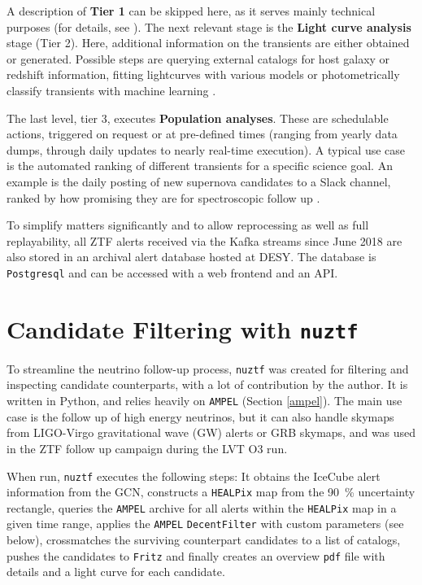 \documentclass[
    a4paper, %
    fontsize=10pt, %
    twoside=true, %
    numbers=noenddot, %
    fontmethod=tex,
]{kaobook}
\begin{document}
A description of \textbf{Tier 1} can be skipped here, as it serves mainly technical purposes (for details, see \cite{Nordin2019}). The next relevant stage is the \textbf{Light curve analysis} stage (Tier 2). Here, additional information on the transients are either obtained or generated. Possible steps are querying external catalogs for host galaxy or redshift information, fitting lightcurves with various models or photometrically classify transients with machine learning \cite{Nordin2019}.

The last level, tier 3, executes \textbf{Population analyses}. These are schedulable actions, triggered on request or at pre-defined times (ranging from yearly data dumps, through daily updates to nearly real-time execution). A typical use case is the automated ranking of different transients for a specific science goal. An example is the daily posting of new supernova candidates to a Slack channel, ranked by how promising they are for spectroscopic follow up \cite{Nordin2019}.

To simplify matters significantly and to allow reprocessing as well as full replayability, all ZTF alerts received via the Kafka streams since June 2018 are also stored in an archival alert database hosted at DESY. The database is \texttt{Postgresql} and can be accessed with a web frontend and an API.

\section{Candidate Filtering with \texttt{nuztf}}
To streamline the neutrino follow-up process, \texttt{nuztf}  was created for filtering and inspecting candidate counterparts, with a lot of contribution by the author. It is written in Python, and relies heavily on \texttt{AMPEL} (Section \ref{ampel}). The main use case is the follow up of high energy neutrinos, but it can also handle skymaps from LIGO-Virgo  gravitational wave (GW) alerts or GRB skymaps, and was used in the ZTF follow up campaign  during the LVT O3 run.

When run, \texttt{nuztf} executes the following steps: It obtains the IceCube alert information from the GCN, constructs a \texttt{HEALPix} map from the \SI{90}{\percent} uncertainty rectangle, queries the \texttt{AMPEL} archive for all alerts within the \texttt{HEALPix} map in a given time range, applies the \texttt{AMPEL} \texttt{DecentFilter} \cite{Nordin2019} with custom parameters (see below), crossmatches the surviving counterpart candidates to a list of catalogs, pushes the candidates to \texttt{Fritz} and finally creates an overview \texttt{pdf} file with details and a light curve for each candidate.
\end{document}
